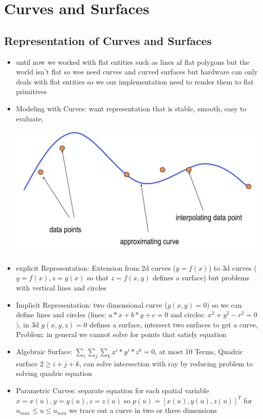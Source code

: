 \documentclass[11pt,a4paper]{article}
\begin{document}
\section{Curves and Surfaces}
	\subsection{Representation of Curves and Surfaces}
	\begin{itemize}
		\item until now we worked with flat entities such as lines af flat polygons but the world isn't flat so wee need curves and curved surfaces but hardware can only deals with flat entities so we our implementation need to render them to flat primitives
		\item Modeling with Curves: want representation that is stable, smooth, easy to evaluate,
		\begin{center}
			\includegraphics[scale=0.5]{pictures/curves.jpg}
		\end{center}
		\item explicit Representation: Extension from 2d curves ($y=f(x)$) to 3d curves ($y=f(x),z=g(x)$ so that $z=f(x,y)$ defines a surface) but problems with vertical lines and circles
		\item Implicit Representation: two dimensional curve ($g(x,y)=0$) so we can define lines and circles (lines: $a*x+b*y+c=0$ and circles: $x^{2}+y^{2}-r^{2}=0$), in 3d $g(x,y,z)=0$ defines a surface, intersect two surfaces to get a curve, Problem: in general we cannot solve for points that satisfy equation
		\item Algebraic Surface: $\sum_{i}\sum_{j}\sum_{k}x^{i}*y^{j}*z^{k}=0$, at most 10 Terms, Quadric surface $2 \geq i+j+k$, can solve intersection with ray by reducing problem to solving quadric equation
		\item Parametric Curves: separate equation for each spatial variable $x=x(u),y=y(u),z=z(u)$ so $p(u)=[x(u),y(u),z(u)]^{T}$ for $u_{max} \leq u \leq u_{min}$ we trace out a curve in two or three dimensions

\end{itemize}
\end{document}
